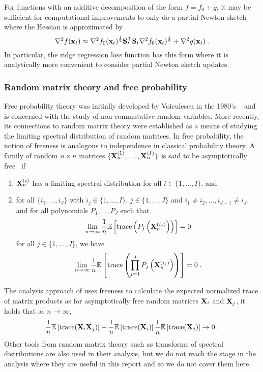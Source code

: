 For functions with an additive decomposition of the form $f=f_0+g$, it may be sufficient for computational improvements to only do a partial Newton sketch~\citep{Pilanci:2017} where the Hessian is approximated by
\[
\nabla^2f(\mathbf{x}_t) \approx \nabla^2f_0(\mathbf{x}_t)^\frac{1}{2}\mathbf{S}_t^\top\mathbf{S}_t\nabla^2f_0(\mathbf{x}_t)^\frac{1}{2} + \nabla^2g(\mathbf{x}_t) \;.
\]
In particular, the ridge regression loss function has this form where it is analytically more convenient to consider partial Newton sketch updates.

\subsubsection{Random matrix theory and free probability}

Free probability theory was initially developed by Voiculescu in the 1980's ~\citep{Anderson:2009} and is concerned with the study of non-commutative random variables. More recently, its connections to random matrix theory were established as a means of studying the limiting spectral distribution of random matrices. In free probability, the notion of freeness is analogous to independence in classical probability theory. A family of random $n\times n$ matrices $\{\mathbf{X}_n^{(1)},\ldots,\mathbf{X}_n^{(I)}\}$ is said to be asymptotically free~\citep{Couillet:2011_free} if
\begin{enumerate}
\item
$\mathbf{X}_n^{(i)}$ has a limiting spectral distribution for all $i\in\{1,\ldots,I\}$, and
\item
for all $\{i_1,\ldots,i_J\}$ with $i_j\in\{1,\ldots,I\}$, $j\in\{1,\ldots,J\}$ and $i_1\neq i_2,\ldots,i_{J-1}\neq i_J$, and for all polynomials $P_1,\ldots,P_J$ such that
\[
\lim_{n\rightarrow\infty} \frac{1}{n}\mathbb{E}\left[\mathrm{trace}\left(P_j\left(\mathbf{X}_n^{(i_j)}\right)\right)\right] = 0
\]
for all $j\in\{1,\ldots,J\}$, we have
\[
\lim_{n\rightarrow\infty} \frac{1}{n}\mathbb{E}\left[\mathrm{trace}\left(\prod_{j=1}^JP_j\left(\mathbf{X}_n^{(i_j)}\right)\right)\right] = 0 \;.
\]
\end{enumerate}
The analysis approach of \citet{Lacotte:2020} uses freeness to calculate the expected normalized trace of matrix products as for asymptotically free random matrices $\mathbf{X}_i$ and $\mathbf{X}_j$, it holds that as $n\rightarrow\infty$,
\[
\frac{1}{n}\mathbb{E}\left[\mathrm{trace}(\mathbf{X}_i\mathbf{X}_j)\right] - \frac{1}{n}\mathbb{E}\left[\mathrm{trace}(\mathbf{X}_i)\right]\frac{1}{n}\mathbb{E}\left[\mathrm{trace}(\mathbf{X}_j)\right] \rightarrow 0 \;.
\]
Other tools from random matrix theory such as transforms of spectral distributions are also used in their analysis, but we do not reach the stage in the analysis where they are useful in this report and so we do not cover them here.


